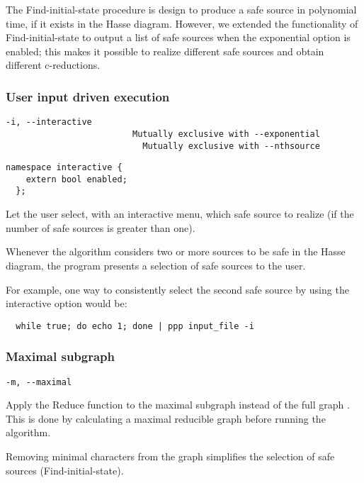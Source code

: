 The Find-initial-state procedure is design to produce a safe source in polynomial time, if it exists in the Hasse diagram.
However, we extended the functionality of Find-initial-state to output a list of safe sources when the exponential option is enabled; this makes it possible to realize different safe sources and obtain different c-reductions.

\subsubsection*{User input driven execution}

\begin{lstlisting}[aboveskip=\smallskipamount]
  -i, --interactive
                         Mutually exclusive with --exponential
                           Mutually exclusive with --nthsource
\end{lstlisting}

\begin{lstlisting}[style=c++_block, aboveskip=\smallskipamount]
  namespace interactive {
    extern bool enabled;
  };
\end{lstlisting}

Let the user select, with an interactive menu, which safe source to realize (if the number of safe sources is greater than one).

Whenever the algorithm considers two or more sources to be safe in the Hasse diagram, the program presents a selection of safe sources to the user.

For example, one way to consistently select the second safe source by using the interactive option would be:

\begin{lstlisting}
  while true; do echo 1; done | ppp input_file -i
\end{lstlisting}

\subsubsection*{Maximal subgraph}

\begin{lstlisting}[aboveskip=\smallskipamount]
  -m, --maximal
\end{lstlisting}

Apply the Reduce function to the maximal subgraph \grbcm{} instead of the full graph \grb{}.
This is done by calculating a maximal reducible graph before running the algorithm.

Removing minimal characters from the graph simplifies the selection of safe sources (Find-initial-state).

